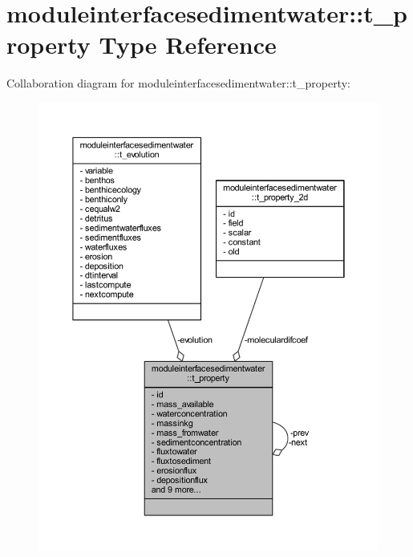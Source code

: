 \hypertarget{structmoduleinterfacesedimentwater_1_1t__property}{}\section{moduleinterfacesedimentwater\+:\+:t\+\_\+property Type Reference}
\label{structmoduleinterfacesedimentwater_1_1t__property}


Collaboration diagram for moduleinterfacesedimentwater\+:\+:t\+\_\+property\+:\nopagebreak
\begin{figure}[H]
\begin{center}
\leavevmode
\includegraphics[width=350pt]{structmoduleinterfacesedimentwater_1_1t__property__coll__graph}
\end{center}
\end{figure}
